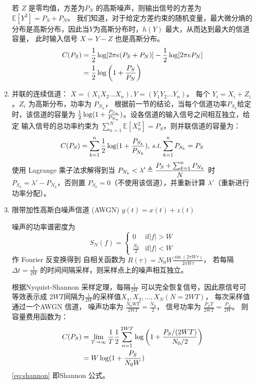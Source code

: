 \documentclass{article}
\def\E{\mathbb{E}}
\begin{document}
\begin{enumerate}
若 $Z$ 是零均值，方差为$P_N$ 的高斯噪声，则输出信号的方差为 $\E[Y^2] = P_S + P_N$。
我们知道，对于给定方差约束的随机变量，最大微分熵的分布是高斯分布，因此当$Y$为高斯分布时，$h(Y)$ 最大，从而达到最大的信道容量， 此时输入信号 $X = Y - Z $ 也是高斯分布。
\begin{align*}
C(P_S)  & = {1 \over 2} \log[2\pi e(P_S + P_N)] - {1 \over 2} \log[2\pi e P_N] \\
  & = {1\over 2} \log\left(1 + {P_S \over P_N}\right)
\end{align*}
\item 并联的连续信道： $X=(X_1X_2\dots X_n), Y=(Y_1Y_2\dots Y_n)$。
每个 $Y_i = X_i + Z_i$。$Z_i$ 为高斯分布，功率为 $P_{N_n}$，
根据前一节的结论，当每个信道功率$P_{S_n}$给定时，该信道的容量为
${1\over 2} \log(1+{P_{S_n} \over P_{N_n}})$。设各信道的输入信号之间相互独立，给定
输入信号的总功率约束为 $\sum_{n=1}^N \E[X_n^2] = P_S$，则并联信道的容量为：
$$
C(P_S) =\sum_{k=1}^n {1\over 2} \log(1+{P_{S_k} \over P_{N_k}}),\, s.t. \sum_{k=1}^n P_{S_k} = P_S
$$
使用 Lagrange 乘子法求解得到当 $P_{N_k} < \lambda' \triangleq \displaystyle{ P_S + \sum_{k=1}^n P_{N_k} \over N}$ 时
$P_{S_k} = \lambda' - P_{N_k}$，否则置 $P_{S_k} = 0 $（不使用该信道），并重新计算 $\lambda'$（重新进行功率分配）。

\item 限带加性高斯白噪声信道 (AWGN) $ y(t) = x(t) + z(t) $

噪声的功率谱密度为  
\begin{equation}
S_N(f)=\begin{cases}
0 & \textrm{if} |f|>W\\
\frac{N_0}{2} & \textrm{if} |f|<W
\end{cases}
\end{equation}
作 Fourier 反变换得到 自相关函数为 $R(\tau) = N_0 W \frac{\sin(2\pi W\tau)}{2\pi W\tau}$，
若每隔$\Delta t = \frac{1}{2W}$ 的时间间隔采样，则采样点上的噪声相互独立。

根据Nyquist-Shannon 采样定理，每隔$\frac{1}{2W}$ 可以完全恢复信号，因此原信号可等效表示成
$2WT$间隔为$\frac{1}{2W}$的采样值$X_1, X_2,\dots, X_N(N=2WT)$， 每次采样值通过一个AWGN 信道， 噪声功率为
$\frac{N_0WT}{2WT} = \frac{N_0}{2}$， 信号功率为 $\frac{P_S T}{2WT} = \frac{P_S}{2W}$。
则容量费用函数为：
\begin{align}\notag
C(P_S) & = \lim_{T \to \infty} \frac{1}{T} \frac{1}{2} \sum_{n=1}^{2WT} \log\left(1+ \frac{P_S/(2WT)}{N_0/2}\right) \\
\label{eq:shannon} & = W \log(1 + \frac{P_S}{N_0 W})
\end{align}
\eqref{eq:shannon} 即Shannon 公式。

\end{enumerate}
\end{document}
